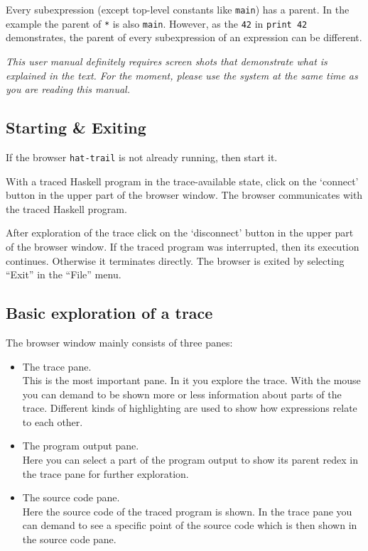\documentclass[12pt]{article}
\begin{document}
Every subexpression (except top-level constants like \texttt{main}) has a parent. In the example the parent of \texttt{*} is also \texttt{main}. However, as the \texttt{42} in \texttt{print 42} demonstrates, the parent of every subexpression of an expression can be different.

\emph{This user manual definitely requires screen shots that demonstrate what is explained in the text. For the moment, please use the system at the same time as you are reading this manual.}


\subsection{Starting \& Exiting}

If the browser \texttt{hat-trail} is not already running, then start it.

With a traced Haskell program in the trace-available
state, click on the `connect' button in the upper part
of the browser window.  
The browser communicates with the traced Haskell program.

After exploration of the trace click on the `disconnect' button in the upper part of the browser window. If the traced program was interrupted, then its execution continues. Otherwise it terminates directly.
The browser is exited by selecting ``Exit'' in the ``File'' menu.

\subsection{Basic exploration of a trace}

The browser window mainly consists of three panes:

\begin{itemize}
\item The trace pane. \\
This is the most important pane. In it you explore the trace. With the mouse you can demand to be shown more or less information about parts of the trace. Different kinds of highlighting are used to show how expressions relate to each other.

\item The program output pane. \\
Here you can select a part of the program output to show its parent redex in the trace pane for further exploration.

\item The source code pane. \\
Here the source code of the traced program is shown. In the trace pane you can demand to see a specific point of the source code which is then shown in the source code pane.
\end{itemize}
\end{document}

